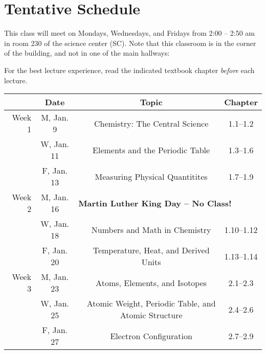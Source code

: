\documentclass[12pt, letterpaper]{article}
\begin{document}
\section*{Tentative Schedule}
This class will meet on Mondays, Wednesdays, and Fridays from 2:00  -- 2:50
am in room 230 of the science center (SC). Note that this classroom is in the corner of the building, and not in one of the main hallways:

\noindent For the best lecture experience, read the indicated textbook chapter \emph{before} each lecture.

\noindent
\begin{tabular}{rcccc}
	       & Date       &                                                                              & Topic                                               & Chapter    \\
	\midrule
	Week 1 & M, Jan. 9  &                                                                              & Chemistry: The Central Science                      & 1.1--1.2   \\
	       & W, Jan. 11 &                                                                              & Elements and the Periodic Table                     & 1.3--1.6   \\
	       & F, Jan. 13 &                                                                              & Measuring Physical Quantitites                      & 1.7--1.9   \\
	\midrule
	Week 2 & M, Jan. 16 & \multicolumn{3}{l}{\textbf{Martin Luther King Day -- No Class!}}                                                                                \\
	       & W, Jan. 18 &                                                                              & Numbers and Math in Chemistry                       & 1.10--1.12 \\
	       & F, Jan. 20 &                                                                              & Temperature, Heat, and Derived Units                & 1.13--1.14 \\
	\midrule
	Week 3 & M, Jan. 23 &                                                                              & Atoms, Elements, and Isotopes                       & 2.1--2.3   \\
	       & W, Jan. 25 &                                                                              & Atomic Weight, Periodic Table, and Atomic Structure & 2.4--2.6   \\
	       & F, Jan. 27 &                                                                              & Electron Configuration                              & 2.7--2.9   \\

\end{tabular}
\end{document}
